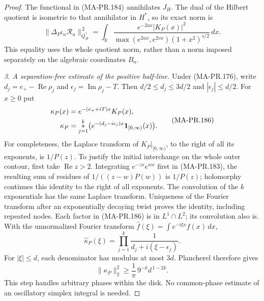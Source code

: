 \begin{proof}
The functional in (MA-PR.184) annihilates \(J_H\).
The dual of the Hilbert quotient is isometric to
that annihilator in \(H^*\), so its exact norm is
\[
 \|\Delta_P\iota_n\mathscr R_n\|_{Q_H^*}^{\,2}
     =\int_{\mathbb R}
          \frac{e^{-2ax}|K_P(x)|^2}
                {\max(e^{2ux},e^{2vx})(1+x^2)^{s/2}}\,dx .
 \tag{MA-PR.185}
\]
This equality uses the whole quotient norm, rather
than a norm imposed separately on the algebraic
coordinates \(B_n\).

\emph{3. A separation-free estimate of the positive half-line.}
Under (MA-PR.176), write
\(d_j=e_+-\operatorname{Re}\rho_j\) and
\(\epsilon_j=\operatorname{Im}\rho_j-T\).  Then
\(d/2\le d_j\le3d/2\) and \(|\epsilon_j|\le d/2\).
For \(x\ge0\) put
\[
 \begin{split}
 \kappa_P(x)&=e^{-(e_++iT)x}K_P(x),\\
 \kappa_P&=
       \mathop{*}_{j=1}^k
       \bigl(e^{-(d_j-i\epsilon_j)x}
                         {\bf1}_{[0,\infty)}(x)\bigr).
 \end{split}
 \tag{MA-PR.186}
\]
For completeness, the Laplace transform of
\(K_P|_{[0,\infty)}\), to the right of all its
exponents, is \(1/P(z)\).  To justify the initial
interchange on the whole outer contour, first take
\(\operatorname{Re}z>2\).  Integrating
\(e^{-zx}e^{wx}\) first in (MA-PR.183), the
resulting sum of residues of
\(1/((z-w)P(w))\) is \(1/P(z)\); holomorphy
continues this identity to the right of all exponents.
The convolution
of the \(k\) exponentials has the same Laplace
transform.  Uniqueness of the Fourier transform
after an exponentially decaying twist proves the
identity, including repeated nodes.  Each factor
in (MA-PR.186) is in \(L^1\cap L^2\); its
convolution also is.  With the unnormalized Fourier
transform \(\widehat f(\xi)=\int e^{-i\xi x}f(x)\,dx\),
\[
       \widehat\kappa_P(\xi)
            =\prod_{j=1}^k
                     \frac1{d_j+i(\xi-\epsilon_j)} .
 \tag{MA-PR.187}
\]
For \(|\xi|\le d\), each denominator has modulus
at most \(3d\).  Plancherel therefore gives
\[
     \|\kappa_P\|_2^2
        \ge\frac1\pi\,9^{-k}d^{\,1-2k}.
 \tag{MA-PR.188}
\]
This step handles arbitrary phases within the
disk.  No common-phase estimate of an oscillatory
simplex integral is needed.


\end{proof}
